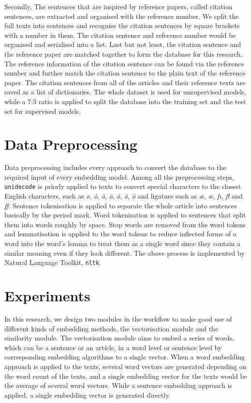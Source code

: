 Secondly, The sentences that are inspired by reference papers, called citation sentences, are extracted and organised with the reference number.
We split the full texts into sentences and recognise the citation sentences by square brackets with a number in them.
The citation sentence and reference number would be organised and serialised into a list.
Last but not least, the citation sentence and the reference paper are matched together to form the database for this research.
The reference information of the citation sentence can be found via the reference number and further match the citation sentence to the plain text of the reference paper.
The citation sentences from all of the articles and their reference texts are saved as a list of dictionaries.
The whole dataset is used for unsupervised models, while a 7:3 ratio is applied to split the database into the training set and the test set for supervised models.

\section{Data Preprocessing}
Data preprocessing includes every approach to convert the database to the required input of every embedding model.
Among all the preprocessing steps, \texttt{unidecode} is priorly applied to texts to convert special characters to the closest English characters, such as \textit{\o}, \textit{\^o}, \textit{\~o}, \textit{\=o}, \textit{\'o}, \textit{\u o}, \textit{\v o} and ligature such as \textit{\ae}, \textit{\oe}, \textit{f\i}, \textit{fl} and \textit{ff}.
Sentence tokenisation is applied to separate the whole article into sentences basically by the period mark.
Word tokenisation is applied to sentences that split them into words roughly by space.
Stop words are removed from the word tokens and lemmatisation is applied to the word tokens to reduce inflected forms of a word into the word's lemma to treat them as a single word since they contain a similar meaning even if they look different.
The above process is implemented by Natural Language Toolkit, \texttt{nltk}.

\section{Experiments}
In this research, we design two modules in the workflow to make good use of different kinds of embedding methods, the vectorisation module and the similarity module.
The vectorisation module aims to embed a series of words, which can be a sentence or an article, in a word level or sentence level by corresponding embedding algorithms to a single vector.
When a word embedding approach is applied to the texts, several word vectors are generated depending on the word count of the texts, and a single embedding vector for the texts would be the average of several word vectors.
While a sentence embedding approach is applied, a single embedding vector is generated directly.

